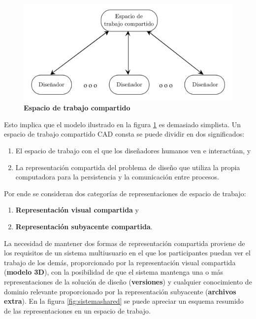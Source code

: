 \begin{figure}[h]
\includegraphics[width=12cm]{Img/CPD/cad-shared0.png}
\centering
\caption{\textbf{\footnotesize{Espacio de trabajo compartido}}}
\label{fig:espacio0}
\end{figure}

Esto implica que el modelo ilustrado en la figura \ref{fig:espacio0} es demasiado simplista. Un espacio de trabajo compartido CAD consta se puede dividir en dos significados:
\begin{enumerate}
\item El espacio de trabajo con el que los diseñadores humanos ven e interactúan, y
\item La representación compartida del problema de diseño que utiliza la propia computadora para la persistencia y la comunicación entre procesos.
\end{enumerate}

Por ende se consideran dos categorías de representaciones de espacio de trabajo:

\begin{enumerate}
    \item \textbf{Representación visual compartida} y
    \item \textbf{Representación subyacente compartida}.
\end{enumerate}
La necesidad de mantener dos formas de representación compartida proviene de los requisitos de un sistema multiusuario en el que los participantes puedan ver el trabajo de los demás, proporcionado por la representación visual compartida (\textbf{modelo 3D}), con la posibilidad de que el sistema mantenga una o más representaciones de la solución de diseño (\textbf{versiones}) y cualquier conocimiento de dominio relevante proporcionado por la representación subyacente (\textbf{archivos extra}). En la figura \ref{fig:sistemashared} se puede apreciar un esquema resumido de las representaciones en un espacio de trabajo.

